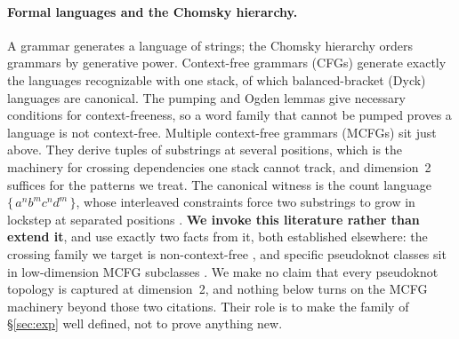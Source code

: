 \documentclass[11pt]{article}
\begin{document}
\paragraph{Formal languages and the Chomsky hierarchy.} A grammar generates a language of strings; the
Chomsky hierarchy \citep{chomsky1956,hopcroftullman1979} orders grammars by generative power. Context-free
grammars (CFGs) generate exactly the languages recognizable with one stack, of which balanced-bracket (Dyck)
languages are canonical. The pumping and Ogden lemmas \citep{ogden1968,hopcroftullman1979} give necessary
conditions for context-freeness, so a word family that cannot be pumped proves a language is not context-free.
Multiple context-free grammars (MCFGs) \citep{seki1991mcfg} sit just above. They derive tuples of substrings at
several positions, which is the machinery for crossing dependencies one stack cannot track, and dimension~2
suffices for the patterns we treat. The canonical witness is the count language $\{\,a^{n}b^{m}c^{n}d^{m}\,\}$,
whose interleaved constraints force two substrings to grow in lockstep at separated positions
\citep{hopcroftullman1979}. \textbf{We invoke this literature rather than extend it}, and
use exactly two facts from it, both established elsewhere: the crossing family we target is non-context-free
\citep{nebelweinberg}, and specific pseudoknot classes sit in low-dimension MCFG subclasses
\citep{katosekikasami2006}. We make no claim that every pseudoknot topology is captured at dimension~2, and
nothing below turns on the MCFG machinery beyond those two citations. Their role is to make the family of
\S\ref{sec:exp} well defined, not to prove anything new.
\end{document}
